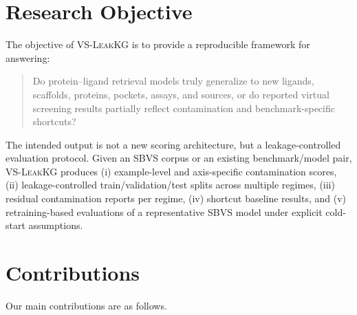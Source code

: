 \documentclass[11pt]{article}
\begin{document}
\section{Research Objective}

The objective of \textsc{VS-LeakKG} is to provide a reproducible framework for answering:
\begin{quote}
Do protein--ligand retrieval models truly generalize to new ligands, scaffolds, proteins, pockets, assays, and sources, or do reported virtual screening results partially reflect contamination and benchmark-specific shortcuts?
\end{quote}
The intended output is not a new scoring architecture, but a leakage-controlled evaluation protocol. Given an SBVS corpus or an existing benchmark/model pair, \textsc{VS-LeakKG} produces (i) example-level and axis-specific contamination scores, (ii) leakage-controlled train/validation/test splits across multiple regimes, (iii) residual contamination reports per regime, (iv) shortcut baseline results, and (v) retraining-based evaluations of a representative SBVS model under explicit cold-start assumptions.

\section{Contributions}

Our main contributions are as follows.
\end{document}
